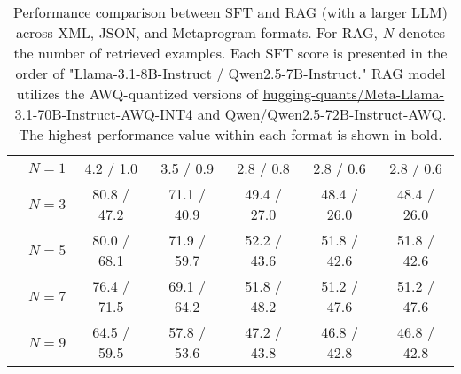 \begin{table*}[!htbp]
{\begin{tabular}{@{}llccccc@{}}
& $N=1$& 4.2 / 1.0& 3.5 / 0.9& 2.8 / 0.8& 2.8 / 0.6& 2.8 / 0.6\\
& $N=3$& 80.8 / 47.2& 71.1 / 40.9& 49.4 / 27.0& 48.4 / 26.0& 48.4 / 26.0\\
& $N=5$& 80.0 / 68.1& 71.9 / 59.7& 52.2 / 43.6& 51.8 / 42.6& 51.8 / 42.6\\
& $N=7$& 76.4 / 71.5& 69.1 / 64.2& 51.8 / 48.2& 51.2 / 47.6& 51.2 / 47.6\\
& $N=9$& 64.5 / 59.5& 57.8 / 53.6& 47.2 / 43.8& 46.8 / 42.8& 46.8 / 42.8\\ \bottomrule
\end{tabular}%
}
\caption{Performance comparison between SFT and RAG (with a larger LLM) across XML, JSON, and Metaprogram formats. For RAG, $N$ denotes the number of retrieved examples. Each SFT score is presented in the order of "Llama-3.1-8B-Instruct / Qwen2.5-7B-Instruct." RAG model utilizes the AWQ-quantized versions of \href{https://huggingface.co/hugging-quants/Meta-Llama-3.1-70B-Instruct-AWQ-INT4}{hugging-quants/Meta-Llama-3.1-70B-Instruct-AWQ-INT4} and \href{https://huggingface.co/Qwen/Qwen2.5-72B-Instruct-AWQ}{Qwen/Qwen2.5-72B-Instruct-AWQ}. The highest performance value within each format is shown in bold.}
\label{tab:rag_versus_sft_llama}
\end{table*}
